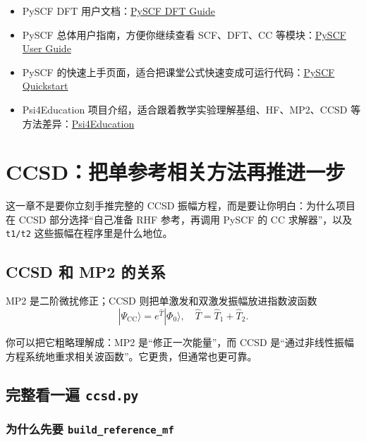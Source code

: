 \documentclass[UTF8,11pt,fontset=fandol]{ctexbook}
\begin{document}
\begin{resourcebox}[继续学习资料]
\begin{itemize}
  \item PySCF DFT 用户文档：\href{https://pyscf.org/user/dft.html}{PySCF DFT Guide}
  \item PySCF 总体用户指南，方便你继续查看 SCF、DFT、CC 等模块：\href{https://pyscf.org/user/index.html}{PySCF User Guide}
  \item PySCF 的快速上手页面，适合把课堂公式快速变成可运行代码：\href{https://pyscf.org/quickstart.html}{PySCF Quickstart}
  \item Psi4Education 项目介绍，适合跟着教学实验理解基组、HF、MP2、CCSD 等方法差异：\href{https://psicode.org/posts/psi4education/}{Psi4Education}
\end{itemize}
\end{resourcebox}

\chapter{CCSD：把单参考相关方法再推进一步}

\begin{goalbox}[本章目标]
这一章不是要你立刻手推完整的 CCSD 振幅方程，而是要让你明白：为什么项目在 CCSD 部分选择“自己准备 RHF 参考，再调用 PySCF 的 CC 求解器”，以及 \texttt{t1/t2} 这些振幅在程序里是什么地位。
\end{goalbox}

\section{CCSD 和 MP2 的关系}

MP2 是二阶微扰修正；CCSD 则把单激发和双激发振幅放进指数波函数
\begin{equation}
|\Psi_{\mathrm{CC}}\rangle = e^{\hat{T}}|\Phi_0\rangle,
\quad
\hat{T} = \hat{T}_1 + \hat{T}_2.
\end{equation}

你可以把它粗略理解成：MP2 是“修正一次能量”，而 CCSD 是“通过非线性振幅方程系统地重求相关波函数”。它更贵，但通常也更可靠。

\section{完整看一遍 \texttt{ccsd.py}}



\subsection*{为什么先要 \texttt{build\_reference\_mf}}
\end{document}
